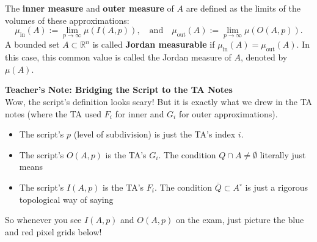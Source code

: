 \begin{definition}
The \textbf{inner measure} and \textbf{outer measure} of $A$ are defined as the limits of the volumes of these approximations:
\[
\mu_{\text{in}}(A) := \lim_{p \to \infty} \mu(I(A, p)), \quad \text{and} \quad \mu_{\text{out}}(A) := \lim_{p \to \infty} \mu(O(A, p)).
\]
A bounded set $A \subset \mathbb{R}^n$ is called \textbf{Jordan measurable} if $\mu_{\text{in}}(A) = \mu_{\text{out}}(A)$. In this case, this common value is called the Jordan measure of $A$, denoted by $\mu(A)$.
\end{definition}

\setcounter{section}{\value{savedSectionJM}}
\setcounter{theorem}{\value{savedDefJM}}

\begin{extra}
\textbf{Teacher's Note: Bridging the Script to the TA Notes}\\
Wow, the script's definition looks scary! But it is exactly what we drew in the TA notes (where the TA used $F_i$ for inner and $G_i$ for outer approximations). 
\begin{itemize}
    \item The script's $p$ (level of subdivision) is just the TA's index $i$.
    \item The script's $O(A,p)$ is the TA's $G_i$. The condition $Q \cap A \neq \emptyset$ literally just means 
    \item The script's $I(A,p)$ is the TA's $F_i$. The condition $\overline{Q} \subset A^\circ$ is just a rigorous topological way of saying 
\end{itemize}
So whenever you see $I(A,p)$ and $O(A,p)$ on the exam, just picture the blue and red pixel grids below!
\end{extra}


